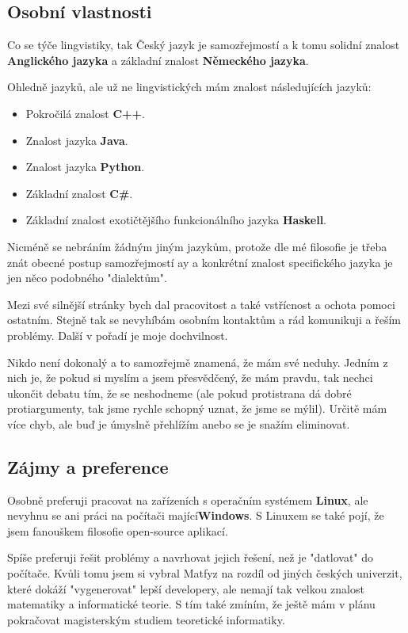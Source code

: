\documentclass{article}
\begin{document}
\subsection*{Osobní vlastnosti}

Co se týče lingvistiky, tak Český jazyk je samozřejmostí a k tomu solidní znalost \textbf{Anglického jazyka }a základní znalost \textbf{Německého jazyka}.

Ohledně jazyků, ale už ne lingvistických mám znalost následujících jazyků:

\begin{itemize}
	\item Pokročilá znalost \textbf{C++}.
	\item Znalost jazyka \textbf{Java}.
	\item Znalost jazyka \textbf{Python}.
	\item Základní znalost \textbf{C\#}.
	\item Základní znalost exotičtějšího funkcionálního jazyka \textbf{Haskell}.
\end{itemize}

Nicméně se nebráním žádným jiným jazykům, protože dle mé filosofie je třeba znát obecné postup samozřejmostí ay a konkrétní znalost specifického jazyka je jen něco podobného "dialektům".

Mezi své silnější stránky bych dal pracovitost a také vstřícnost a ochota pomoci ostatním. Stejně tak se nevyhíbám osobním kontaktům a rád komunikuji a řeším problémy. Další v pořadí je moje dochvilnost.

Nikdo není dokonalý a to samozřejmě znamená, že mám své neduhy. Jedním z nich je, že pokud si myslím a jsem přesvědčený, že mám pravdu, tak nechci ukončit debatu tím, že se neshodneme (ale pokud protistrana dá dobré protiargumenty, tak jsme rychle schopný uznat, že jsme se mýlil). Určitě mám více chyb, ale buď je úmyslně přehlížím anebo se je snažím eliminovat.

\subsection*{Zájmy a preference}

Osobně preferuji pracovat na zařízeních s operačním systémem \textbf{Linux}, ale nevyhnu se ani práci na počítači mající\textbf{Windows}. S Linuxem se také pojí, že jsem fanouškem filosofie open-source aplikací.

Spíše preferuji řešit problémy a navrhovat jejich řešení, než je "datlovat" do počítače. Kvůli tomu jsem si vybral Matfyz na rozdíl od jiných českých univerzit, které dokáží "vygenerovat" lepší developery, ale nemají tak velkou znalost matematiky a informatické teorie. S tím také zmíním, že ještě mám v plánu pokračovat magisterským studiem teoretické informatiky.
\end{document}
